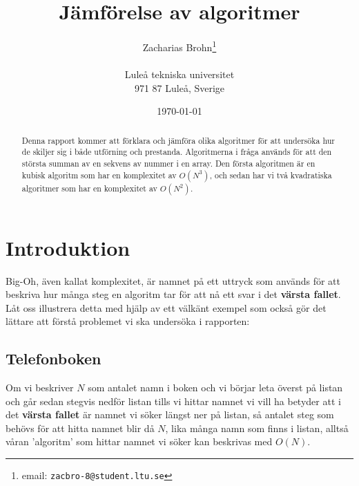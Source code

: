 \documentclass[a4paper,12pt]{article}
\title{Jämförelse av algoritmer}
\author{Zacharias Brohn\thanks{email: \texttt{zacbro-8@student.ltu.se}}\\  
        ~ \\
        Luleå tekniska universitet \\ 
        971 87 Luleå, Sverige}
\date{\today}
\begin{document}
\linenumbers %
\maketitle
%
\begin{abstract}
  Denna rapport kommer att förklara och jämföra olika algoritmer för att
  undersöka hur de skiljer sig i både utförning och prestanda. Algoritmerna i
  fråga används för att den största summan av en sekvens av nummer i en array.
  Den första algoritmen är en kubisk algoritm som har en komplexitet av
  $O\left(N^3\right)$, och sedan har vi två kvadratiska algoritmer som har en
  komplexitet av $O\left(N^2\right)$.
\end{abstract}
%
\section{Introduktion}
\label{sec:introduktion}
Big-Oh, även kallat komplexitet, är namnet på ett uttryck som används för att
beskriva hur många steg en algoritm tar för att nå ett svar i det
\textbf{värsta fallet}. Låt oss illustrera detta med hjälp av ett välkänt
exempel som också gör det lättare att förstå problemet vi ska undersöka i
rapporten:
\subsection*{Telefonboken}
Om vi beskriver $N$ som antalet namn i boken och vi börjar leta överst på
listan och går sedan stegvis nedför listan tills vi hittar namnet vi vill ha
betyder att i det \textbf{värsta fallet} är namnet vi söker längst ner på
listan, så antalet steg som behövs för att hitta namnet blir då $N$, lika många
namn som finns i listan, alltså våran 'algoritm' som hittar namnet vi söker kan
beskrivas med $O\left(N\right)$.
%
\newpage
\end{document}
